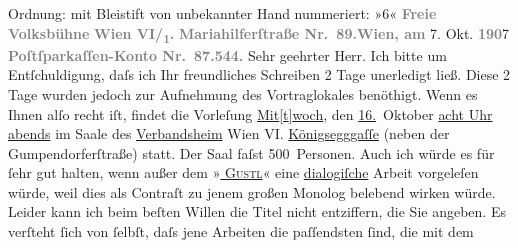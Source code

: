 \begin{ledgroupsized}[t]{13cm}
{\newline{}Ordnung: mit Bleistift von unbekannter Hand nummeriert:
                                 »6« }\toendnotes[C]{\smallbreak}\pstart
           \noindent{}{\pb}\textcolor{gray}{\textbf{Freie Volksbühne}}\pend
           \pstart
           \textcolor{gray}{\textbf{Wien VI/\textsubscript{1}.}}\pend
           \pstart
           \textcolor{gray}{\textbf{Mariahilferſtraße Nr. 89.}}\hfill \textcolor{gray}{\textbf{Wien, am}} 7. Okt. \textcolor{gray}{\textbf{190}}7\pend
           \pstart
           \textcolor{gray}{\textbf{Poſtſparkaſſen-Konto Nr. 87.544.}}\pend
           \pstart\center{}Sehr geehrter Herr.\pend\pstart
           Ich bitte um Entſchuldigung, daſs ich Ihr freundliches Schreiben 2 Tage unerledigt
               ließ.\pend
           \pstart
           Diese 2 Tage wurden jedoch zur Aufnehmung des Vortraglokales benöthigt. Wenn es Ihnen
               alſo recht iſt, findet die Vorleſung\pend
           \pstart
           \centering{}\uline{Mit{[}t{]}woch}, den \uline{16.} Oktober\pend
           \pstart
           \noindent{}\centering{}\uline{acht Uhr abends}\pend
           \pstart
           \noindent{}im Saale des \uline{Verbandsheim}{ }Wien VI. \uline{Königsegggaſſe} (neben der Gumpendorferſtraße) statt. Der
               Saal faſst 500 Personen.\pend
           \pstart
           Auch ich würde es für ſehr gut halten, wenn außer {\pb}dem »\textsc{\uline{\label{T_L01717-1v}\label{T_L01717-1h}}}\textsc{\uline{{ }Gustl}}« eine \uline{dialogiſche} Arbeit vorgeleſen würde, weil
               dies als Contraſt zu jenem großen  Monolog
               belebend wirken würde. Leider kann ich beim beſten Willen die  Titel nicht entziffern, die Sie angeben.\pend
           \pstart
           Es verſteht ſich von ſelbſt, daſs jene Arbeiten die paſſendsten ſind, die mit dem

\end{ledgroupsized}
